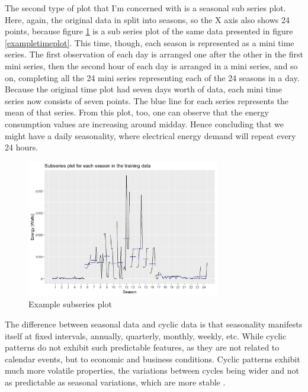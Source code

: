 \documentclass[12pt,a4paper,titlepage]{report}
\begin{document}
The second type of plot that I'm concerned with is a seasonal sub series plot. Here, again, the original data in split into seasons, so the X axis also shows 24 points, because figure \ref{examplesubseriesplot} is a sub series plot of the same data presented in figure \ref{exampletimeplot}.
This time, though, each season is represented as a mini time series. The first observation of each day is arranged one after the other in the first mini series, then the second hour of each day is arranged in a mini series, and so on, completing all the 24 mini series representing each of the 24 seasons in a day. Because the original time plot had seven days worth of data, each mini time series now consists of seven points. The blue line for each series represents the mean of that series. From this plot, too, one can observe that the energy consumption values are increasing around midday. Hence concluding that we might have a daily seasonality, where electrical energy demand will repeat every 24 hours.

\begin{figure}[h]
    \centering
    \includegraphics[width=0.75\textwidth]{d1hrsph1subseriesplot}
    \caption{Example subseries plot}
    \label{examplesubseriesplot}
\end{figure}

The difference between seasonal data and cyclic data is that seasonality manifests itself at fixed intervals, annually, quarterly, monthly, weekly, etc. While cyclic patterns do not exhibit such predictable features, as they are not related to calendar events, but to economic and business conditions. Cyclic patterns exhibit much more volatile properties, the variations between cycles being wider and not as predictable as seasonal variations, which are more stable \cite{fpp2tspatterns}.
\end{document}

